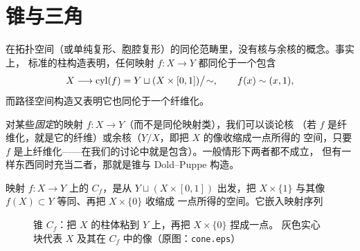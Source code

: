 \section{锥与三角}\label{sec:cone}

在拓扑空间（或单纯复形、胞腔复形）的同伦范畴里，没有核与余核的概念。事实上，
标准的柱构造表明，任何映射 $f\colon X\to Y$ 都同伦于一个包含
$$
X\longrightarrow \operatorname{cyl}(f)=Y\sqcup(X\times[0,1])\big/\!\sim,\qquad
f(x)\sim(x,1),
$$
而路径空间构造又表明它也同伦于一个纤维化。

对某些\emph{固定}的映射 $f\colon X\to Y$（而不是同伦映射类），我们可以谈论核
（若 $f$ 是纤维化，就是它的纤维）或余核（$Y/X$，即把 $X$ 的像收缩成一点所得的
空间，只要 $f$ 是上纤维化——在我们的讨论中就是包含）。一般情形下两者都不成立，
但有一样东西同时充当二者，那就是锥与 Dold--Puppe 构造。

映射 $f\colon X\to Y$ 上的 $C_f$，是从 $Y\sqcup(X\times[0,1])$
出发，把 $X\times\{1\}$ 与其像 $f(X)\subset Y$ 等同、再把 $X\times\{0\}$ 收缩成
一点所得的空间。它嵌入映射序列
\begin{figure}[htbp]
\centering
{}
\caption{锥 $C_f$：把 $X$ 的柱体粘到 $Y$ 上，再把 $X\times\{0\}$ 捏成一点。
灰色实心块代表 $X$ 及其在 $C_f$ 中的像（原图：\texttt{cone.eps}）}
\label{fig:cone}
\end{figure}

